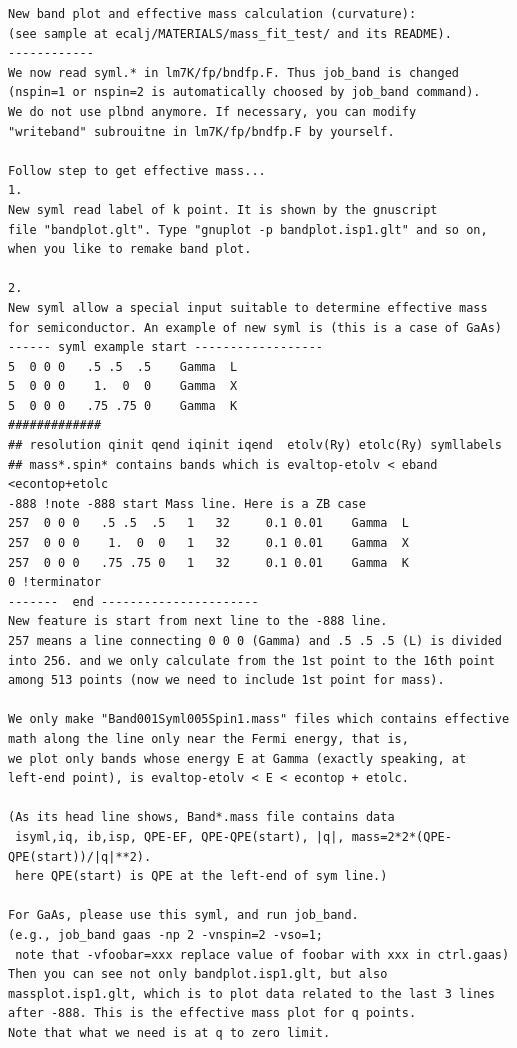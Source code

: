 \documentclass[a4paper,10pt,epsf,fleqn]{article}
\begin{document}
\begin{verbatim}
New band plot and effective mass calculation (curvature):
(see sample at ecalj/MATERIALS/mass_fit_test/ and its README).
------------
We now read syml.* in lm7K/fp/bndfp.F. Thus job_band is changed
(nspin=1 or nspin=2 is automatically choosed by job_band command).
We do not use plbnd anymore. If necessary, you can modify
"writeband" subrouitne in lm7K/fp/bndfp.F by yourself.

Follow step to get effective mass...
1. 
New syml read label of k point. It is shown by the gnuscript
file "bandplot.glt". Type "gnuplot -p bandplot.isp1.glt" and so on,
when you like to remake band plot.

2. 
New syml allow a special input suitable to determine effective mass
for semiconductor. An example of new syml is (this is a case of GaAs)
------ syml example start ------------------
5  0 0 0   .5 .5  .5    Gamma  L
5  0 0 0    1.  0  0    Gamma  X
5  0 0 0   .75 .75 0    Gamma  K
#############
## resolution qinit qend iqinit iqend  etolv(Ry) etolc(Ry) symllabels
## mass*.spin* contains bands which is evaltop-etolv < eband <econtop+etolc
-888 !note -888 start Mass line. Here is a ZB case
257  0 0 0   .5 .5  .5   1   32     0.1 0.01    Gamma  L
257  0 0 0    1.  0  0   1   32     0.1 0.01    Gamma  X
257  0 0 0   .75 .75 0   1   32     0.1 0.01    Gamma  K
0 !terminator  
-------  end ----------------------
New feature is start from next line to the -888 line.
257 means a line connecting 0 0 0 (Gamma) and .5 .5 .5 (L) is divided
into 256. and we only calculate from the 1st point to the 16th point
among 513 points (now we need to include 1st point for mass).

We only make "Band001Syml005Spin1.mass" files which contains effective
math along the line only near the Fermi energy, that is,
we plot only bands whose energy E at Gamma (exactly speaking, at
left-end point), is evaltop-etolv < E < econtop + etolc.

(As its head line shows, Band*.mass file contains data
 isyml,iq, ib,isp, QPE-EF, QPE-QPE(start), |q|, mass=2*2*(QPE-QPE(start))/|q|**2).
 here QPE(start) is QPE at the left-end of sym line.)

For GaAs, please use this syml, and run job_band.
(e.g., job_band gaas -np 2 -vnspin=2 -vso=1; 
 note that -vfoobar=xxx replace value of foobar with xxx in ctrl.gaas)
Then you can see not only bandplot.isp1.glt, but also
massplot.isp1.glt, which is to plot data related to the last 3 lines
after -888. This is the effective mass plot for q points.
Note that what we need is at q to zero limit.


\end{verbatim}
\end{document}
